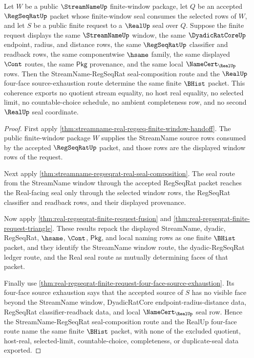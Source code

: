 \begin{theorem}
\label{thm:streamname-regseqrat-real-finite-request-seal-coherence}
Let $W$ be a public $\StreamNameUp$ finite-window package, let $Q$ be an accepted $\RegSeqRatUp$ packet whose finite-window seal consumes the selected rows of $W$, and let $S$ be a public finite request to a $\RealUp$ seal over $Q$. Suppose the finite request displays the same $\StreamNameUp$ window, the same $\DyadicRatCoreUp$ endpoint, radius, and distance rows, the same $\RegSeqRatUp$ classifier and readback rows, the same componentwise $\hsame$ family, the same displayed $\Cont$ routes, the same $\mathsf{Pkg}$ provenance, and the same local $\NameCert_{\RealUp}$ rows. Then the StreamName-RegSeqRat seal-composition route and the $\RealUp$ four-face source-exhaustion route determine the same finite $\BHist$ packet. This coherence exports no quotient stream equality, no host real equality, no selected limit, no countable-choice schedule, no ambient completeness row, and no second $\RealUp$ seal coordinate.
\end{theorem}
\begin{proof}
First apply \autoref{thm:streamname-real-regseq-finite-window-handoff}. The public finite-window package $W$ supplies the StreamName source rows consumed by the accepted $\RegSeqRatUp$ packet, and those rows are the displayed window rows of the request.

Next apply \autoref{thm:streamname-regseqrat-real-seal-composition}. The seal route from the StreamName window through the accepted RegSeqRat packet reaches the Real-facing seal only through the selected window rows, the RegSeqRat classifier and readback rows, and their displayed provenance.

Now apply \autoref{thm:real-regseqrat-finite-request-fusion} and \autoref{thm:real-regseqrat-finite-request-triangle}. These results repack the displayed StreamName, dyadic, RegSeqRat, $\hsame$, $\Cont$, $\mathsf{Pkg}$, and local naming rows as one finite $\BHist$ packet, and they identify the StreamName window route, the dyadic-RegSeqRat ledger route, and the Real seal route as mutually determining faces of that packet.

Finally use \autoref{thm:real-regseqrat-finite-request-four-face-source-exhaustion}. Its four-face source exhaustion says that the accepted source of $S$ has no visible face beyond the StreamName window, DyadicRatCore endpoint-radius-distance data, RegSeqRat classifier-readback data, and local $\NameCert_{\RealUp}$ seal row. Hence the StreamName-RegSeqRat seal-composition route and the RealUp four-face route name the same finite $\BHist$ packet, with none of the excluded quotient, host-real, selected-limit, countable-choice, completeness, or duplicate-seal data exported.
\end{proof}


